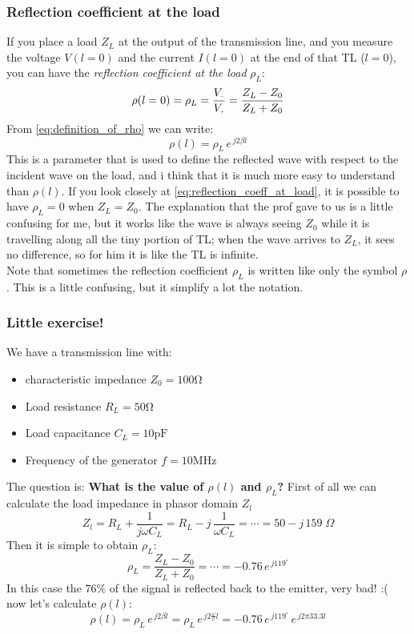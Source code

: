 \subsubsection*{Reflection coefficient at the load}
If you place a load $Z_L$ at the output of the transmission line, and you measure the voltage $V(l=0)$ and the current $I(l=0)$ at the end of that TL ($l=0$), you can have the \emph{reflection coefficient at the load} $\rho_L$:
\begin{equation}\label{eq:reflection_coeff_at_load}
    \rho(l=0)=\rho_L=\frac{V\bottomMinus}{V\bottomPlus}=\frac{Z_L-Z_0}{Z_L+Z_0}
\end{equation}
From \cref{eq:definition_of_rho} we can write:
\begin{equation}\label{eq:reflection_coeff_at_load2}
    \rho(l)=\rho_L\,e^{\,j2\beta l}
\end{equation}
This is a parameter that is used to define the reflected wave with respect to the
incident wave on the load, and i think that it is much more easy to understand than $\rho(l)$.
If you look closely at \cref{eq:reflection_coeff_at_load}, it is possible to have $\rho_L=0$ when $Z_L=Z_0$. The explanation that the prof gave to us is a little confusing for me, but it works like the wave is always seeing $Z_0$ while it is travelling along all the tiny portion of TL; when the wave arrives to $Z_L$, it sees no difference, so for him it is like the TL is infinite.\\
Note that sometimes the reflection coefficient $\rho_L$ is written like only the symbol $\rho$. This is a little confusing, but it simplify a lot the notation.
\subsubsection*{Little exercise!}
We have a transmission line with:
\begin{itemize}
    \item characteristic impedance $Z_0 = 100 \si{\ohm}$
    \item Load resistance $R_L=50 \si{\ohm}$ 
    \item Load capacitance $C_L=10 \si{\pico\farad}$
    \item Frequency of the generator $f=10\si{\mega\hertz}$
\end{itemize}
The question is: \textbf{What is the value of $\rho(l)$ and $\rho_L$?}
First of all we can calculate the load impedance in phasor domain $Z_l$
\begin{equation*}
    Z_l=R_L+\frac{1}{j\omega C_L}=R_L-j\,\frac{1}{\omega C_L}=\cdots =50-j\,159\;\Omega
\end{equation*}
Then it is simple to obtain $\rho_L$:
\begin{equation*}
    \rho_L =\frac{Z_L-Z_0}{Z_L+Z_0}=\cdots =-0.76\,e^{\,j119^{\circ}}
\end{equation*}
In this case the 76\% of the signal is reflected back to the emitter, very bad! :(\\
now let's calculate $\rho(l)$:
\begin{equation*}
    \rho(l)=\rho_L\,e^{\,j2\beta l}=\rho_L\,e^{\,j2\frac{\omega}{c} l}=-0.76\,e^{\,j119^{\circ}}\,e^{\,j 2\pi 33.3 l}
\end{equation*}
